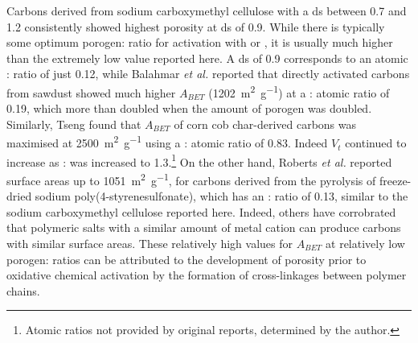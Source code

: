 Carbons derived from sodium carboxymethyl cellulose with a \acrshort{ds} between 0.7 and 1.2 consistently showed highest porosity at \acrshort{ds} of 0.9. While there is typically some optimum porogen: ratio for activation with  or , it is usually much higher than the extremely low value reported here.\citep{Sevilla2014Energy, Balahmar2017Biomass, tseng2006mesopore, Singh2019CO2, Boujibar2018CO2} A \acrshort{ds} of 0.9 corresponds to  an atomic : ratio of just 0.12, while Balahmar \textit{et al.} reported that directly activated carbons from sawdust showed much higher $A_{BET}$ (\qty{1202}{\metre\squared\per\gram}) at a : atomic ratio of 0.19, which more than doubled when the amount of \gls{porogen} was doubled.\citep{Balahmar2017Biomass} Similarly, Tseng found that $A_{BET}$ of corn cob char-derived carbons was maximised at \qty{2500}{\metre\squared\per\gram} using a : atomic ratio of 0.83. Indeed $V_t$ continued to increase as : was increased to 1.3.\citep{tseng2006mesopore}\footnote{Atomic ratios not provided by original reports, determined by the author.} On the other hand, Roberts \textit{et al.} reported surface areas up to \qty{1051}{\metre\squared\per\gram}, for carbons derived from the pyrolysis of freeze-dried sodium poly(4-styrenesulfonate), which has an : ratio of 0.13, similar to the sodium carboxymethyl cellulose reported here.\citep{Roberts2015Hierarchically} Indeed, others have corrobrated that polymeric salts with a similar amount of metal cation can produce carbons with similar surface areas.\citep{Yadav20123D, Puthusseri20143D, Hines2004Surface} These relatively high values for $A_{BET}$ at relatively low \gls{porogen}: ratios can be attributed to the development of porosity prior to oxidative chemical activation by the formation of cross-linkages between polymer chains. 


